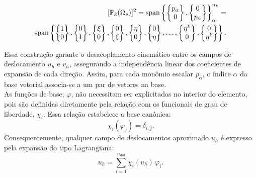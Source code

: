     \begin{equation}
        \begin{aligned}
            \relax [\mathbb{P}_k(\Omega_v)]^2 = \operatorname{span} \left\{ \begin{Bmatrix} p_\alpha \\ 0 \end{Bmatrix}, \begin{Bmatrix} 0 \\ p_\alpha \end{Bmatrix} \right\}_{\alpha}^{n_k} = \\ \operatorname{span} \left\{ \begin{Bmatrix} 1 \\ 0 \end{Bmatrix}, \begin{Bmatrix} 0 \\ 1 \end{Bmatrix}, \begin{Bmatrix} \xi \\ 0 \end{Bmatrix}, \begin{Bmatrix} 0 \\ \xi \end{Bmatrix}, \begin{Bmatrix} \eta \\ 0 \end{Bmatrix}, \begin{Bmatrix} 0 \\ \eta \end{Bmatrix}, \dots, \begin{Bmatrix} \eta^k \\ 0 \end{Bmatrix}, \begin{Bmatrix} 0 \\ \eta^k \end{Bmatrix} \right\}.
        \end{aligned}
        \label{eq:4.15}
    \end{equation}

    \indent Essa construção garante o desacoplamento cinemático entre os campos de deslocamento $u_h$ e $v_h$, assegurando a independência linear dos coeficientes de expansão de cada direção. Assim, para cada monômio escalar $p_\alpha$, o índice $\alpha$ da base vetorial associa-se a um par de vetores na base.\\
    \indent As funções de base, $\varphi$, não necessitam ser explicitadas no interior do elemento, pois são definidas diretamente pela relação com os funcionais de grau de liberdade, $\chi_i$. Essa relação estabelece a base canônica:
    \begin{equation}
        \chi_i(\varphi_j) = \delta_{i,j}.
    \end{equation}
    \noindent Consequentemente, qualquer campo de deslocamentos aproximado $u_h$ é expresso pela expansão do tipo Lagrangiana:
    \begin{equation}
        u_h = \sum_{i=1}^{n_{\mathrm{dof}}} \chi_i(u_h) \, \varphi_i.
        \label{eq:4.16}
    \end{equation}

